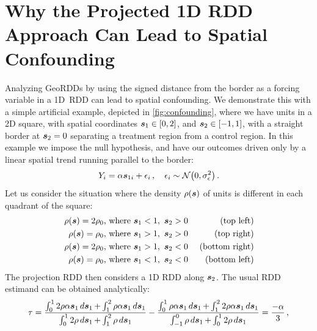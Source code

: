 \section{Why the Projected 1D RDD Approach Can Lead to Spatial Confounding}
\label{sec:confounding}

    Analyzing GeoRDDs by using the signed distance from the border as a forcing variable in a 1D~RDD can lead to spatial confounding.
We demonstrate this with a simple artificial example, depicted in \autoref{fig:confounding}, where we have units in a 2D square, with spatial coordinates \(\bm{s}_1 \in [0,2]\), and \(\bm{s}_2 \in [-1,1]\), with a straight border at \(\bm{s}_2=0\) separating a treatment region from a control region.
In this example we impose the null hypothesis, and have our outcomes driven only by a linear spatial trend running parallel to the border:
\begin{equation}
    Y_{i} = \alpha \svec_{1i} + \epsilon_i \,,\quad\epsilon_i \sim \normal\del{0, \sigman^2}
    \,.
\end{equation}
Let us consider the situation where the density \(\rho(\bm{s})\) of units is different in each quadrant of the square:
\begin{equation}
    \begin{aligned}
        \rho(\bm{s}) = 2\rho_0 & \text{, where }\bm{s}_1 < 1,~\bm{s}_2 > 0 & \text{ (top left)} \\
        \rho(\bm{s}) = \rho_0 & \text{, where }\bm{s}_1 > 1,~\bm{s}_2 > 0 & \text{ (top right)} \\
        \rho(\bm{s}) = 2\rho_0 & \text{, where }\bm{s}_1 > 1,~\bm{s}_2 < 0 & \text{ (bottom right)}  \\
        \rho(\bm{s}) = \rho_0 & \text{, where }\bm{s}_1 < 1,~\bm{s}_2 < 0 & \text{ (bottom left)}
    \end{aligned}
\end{equation}
The projection RDD then considers a 1D RDD along \(\bm{s}_2\).
The usual RDD estimand  can be obtained analytically:
\begin{equation}
    \tau = \frac{
            \int_{0}^{1}  2\rho \alpha \bm{s}_{1} \mathop{d \bm{s}}_{1}
            + \int_{1}^{2}  \rho \alpha \bm{s}_{1} \mathop{d \bm{s}}_{1}
        }{
            \int_{0}^{1}  2\rho \mathop{d \bm{s}}_{1}
            + \int_{1}^{2}  \rho \mathop{d \bm{s}}_{1}
        }
        -
        \frac{
            \int_{0}^{1} \rho \alpha \bm{s}_{1} \mathop{d \bm{s}}_{1}
            + \int_{1}^{2} 2\rho \alpha \bm{s}_{1} \mathop{d \bm{s}}_{1}
        }{
            \int_{-1}^{0} \rho \mathop{d \bm{s}}_{1}
            + \int_{0}^{1} 2\rho \mathop{d \bm{s}}_{1}
        }
    = \frac{-\alpha}{3}
    \,,
\end{equation}
